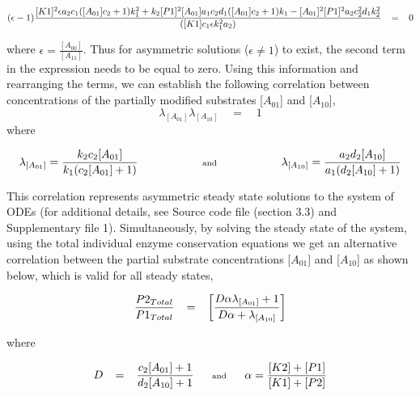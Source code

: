 \documentclass[9pt,lineno]{elife}
\begin{document}
\begin{appendixbox}
\begin{equation}
   \scriptsize{(\epsilon-1)\frac{[K1]^2\epsilon a_2c_1([A_{01}]c_2+1)k_1^2+k_2[P1]^2[A_{01}]a_1c_2d_1([A_{01}]c_2+1)k_1-[A_{01}]^2[P1]^2a_2c_2^2d_1k_2^2}{([K1]c_1\epsilon k_1^2a_2)} \quad = \quad 0}
\end{equation}

where $\epsilon = \frac{[A_{00}]}{[A_{11}]}$. Thus for asymmetric solutions ($\epsilon \neq 1$) to exist, the second term in the expression needs to be equal to zero. Using this information and rearranging the terms, we can establish the following correlation between concentrations of the partially modified substrates [$A_{01}$] and [$A_{10}$], $$\lambda_{[A_{01}]} \lambda_{[A_{10}]} \quad = \quad 1$$ where 

\begin{equation}
    \scriptsize{\lambda_{[A_{01}]} = \frac{k_2c_2[A_{01}]}{k_1(c_2[A_{01}]+1)} \hspace{20mm} \textrm{and} \hspace{20mm} \lambda_{[A_{10}]} = \frac{a_2d_2[A_{10}]}{a_1(d_2[A_{10}]+1)}}
    \label{Eqn: system3 case 1 - Asymm}
\end{equation}

This correlation represents asymmetric steady state solutions to the system of ODEs (for additional details, see Source code file (section 3.3) and Supplementary file 1). Simultaneously, by solving the steady state of the system, using the total individual enzyme conservation equations we get an alternative correlation between the partial substrate concentrations [$A_{01}$] and [$A_{10}$] as shown below, which is valid for all steady states,

\begin{equation}
    \scriptsize{ \frac{P2_{Total}}{P1_{Total}} \quad = \quad \left[ \frac{D\alpha\lambda_{[A_{01}]}+1}{D\alpha + \lambda_{[A_{10}]}} \right]}
    \label{Eqn: system3 case 1 - All}
\end{equation}

where 

\begin{equation}
    \scriptsize{D \quad = \quad \frac{c_2[A_{01}]+1}{d_2[A_{10}]+1} \qquad \textrm{and} \qquad \alpha = \frac{[K2] + [P1]}{[K1] + [P2]}}
\end{equation}


\end{appendixbox}
\end{document}

